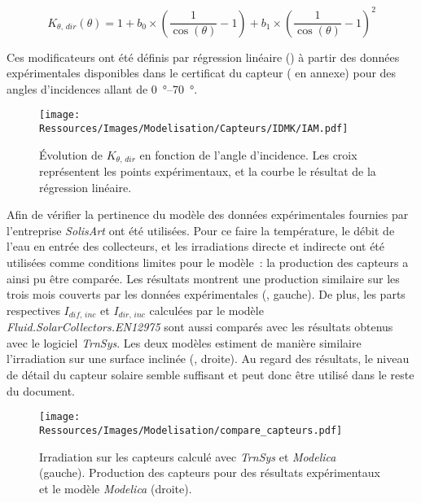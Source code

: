 \begin{equation}\label{eq:iam_dir_plan_model}
    K_{\theta,\,dir} (\theta) = 1 + b_{0} \times \left(\frac{1}{\cos(\theta)} - 1\right)
                                  + b_{1} \times \left(\frac{1}{\cos(\theta)} - 1\right)^{2}
\end{equation}

Ces modificateurs ont été définis par régression linéaire () à partir des données
expérimentales disponibles dans le certificat du capteur ( en annexe)
pour des angles d’incidences allant de \SIrange{0}{70}{\degree}.

\begin{figure}
    \centering
    \texttt{[image: Ressources/Images/Modelisation/Capteurs/IDMK/IAM.pdf]}
    \caption[ pour le rayonnement direct]
             {Évolution de $K_{\theta,\,dir}$ en fonction de l’angle d’incidence.
              Les croix représentent les points expérimentaux, et la courbe le résultat
              de la régression linéaire.}
    \label{fig:IAM_idmk}
\end{figure}

Afin de vérifier la pertinence du modèle des données expérimentales fournies par
l’entreprise \textit{SolisArt} ont été utilisées. Pour ce faire la température, le débit
de l’eau en entrée des collecteurs, et les irradiations directe et indirecte ont été
utilisées comme conditions limites pour le modèle~: la production des capteurs a ainsi pu
être comparée. Les résultats montrent une production similaire sur les trois mois couverts
par les données expérimentales (, gauche). De plus, les
parts respectives $I_{dif,\,inc}$ et $I_{dir,\,inc}$ calculées par le modèle
\textit{Fluid.SolarCollectors.EN12975} sont aussi comparés avec les résultats obtenus avec
le logiciel \textit{TrnSys}. Les deux modèles estiment de manière similaire l’irradiation
sur une surface inclinée (, droite). Au regard des résultats,
le niveau de détail du capteur solaire semble suffisant et peut donc être utilisé dans le
reste du document.

\begin{figure}
    \centering
    \texttt{[image: Ressources/Images/Modelisation/compare\_capteurs.pdf]}
    \caption[Comparaisons de l’irradiation entre \textit{TrnSys}, \textit{Modelica} et des résultats expérimentaux]
             {Irradiation sur les capteurs calculé avec \textit{TrnSys} et \textit{Modelica} (gauche).
             Production des capteurs pour des résultats expérimentaux et le modèle \textit{Modelica} (droite).}
    \label{fig:compare_capteurs}
\end{figure}
\FloatBarrier


